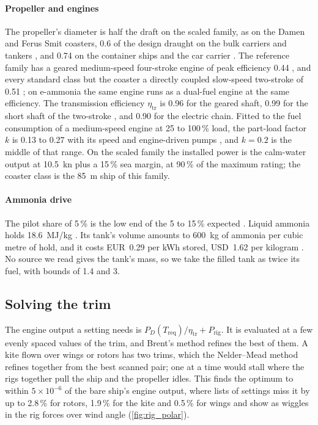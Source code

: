 \paragraph{Propeller and engines} The propeller's diameter is half the draft on the scaled family, as on the Damen and Ferus Smit coasters, 0.6 of the design draught on the bulk carriers and tankers \citep{man2019mr}, and 0.74 on the container ships and the car carrier \citep{man2011}. The reference family has a geared medium-speed four-stroke engine of peak efficiency 0.44 \citep{wartsila2024w20}, and every standard class but the coaster a directly coupled slow-speed two-stroke of 0.51 \citep[Table 19]{faber2020}; on e-ammonia the same engine runs as a dual-fuel engine at the same efficiency. The transmission efficiency $\eta_\mathrm{tr}$ is 0.96 for the geared shaft, 0.99 for the short shaft of the two-stroke \citep{man2011}, and 0.90 for the electric chain. Fitted to the fuel consumption of a medium-speed engine at 25 to 100\,\% load, the part-load factor $k$ is 0.13 to 0.27 with its speed and engine-driven pumps \citep[p.~137]{man2024l2131}, and $k=0.2$ is the middle of that range. On the scaled family the installed power is the calm-water output at \SI{10.5}{kn} plus a 15\,\% sea margin, at 90\,\% of the maximum rating; the coaster class is the \SI{85}{m} ship of this family.

\paragraph{Ammonia drive} The pilot share of 5\,\% is the low end of the 5 to 15\,\% expected \citep{mmmczcs2021fuel}. Liquid ammonia holds \SI{18.6}{MJ/kg} \citep{irena2021ship}. Its tank's volume \citep{mmmczcs2021fuel} amounts to \SI{600}{kg} of ammonia per cubic metre of hold, and it costs EUR~0.29 per kWh stored, USD~1.62 per kilogram \citep{kanchiralla2022}. No source we read gives the tank's mass, so we take the filled tank as twice its fuel, with bounds of 1.4 and 3.

\subsection{Solving the trim}
\label{sec:det_balance}

The engine output a setting needs is $P_D(T_\mathrm{req})/\eta_\mathrm{tr}+P_\mathrm{rig}$. It is evaluated at a few evenly spaced values of the trim, and Brent's method refines the best of them. A kite flown over wings or rotors has two trims, which the Nelder--Mead method refines together from the best scanned pair; one at a time would stall where the rigs together pull the ship and the propeller idles. This finds the optimum to within $5\times10^{-6}$ of the bare ship's engine output, where lists of settings miss it by up to 2.8\,\% for rotors, 1.9\,\% for the kite and 0.5\,\% for wings and show as wiggles in the rig forces over wind angle (\cref{fig:rig_polar}).

